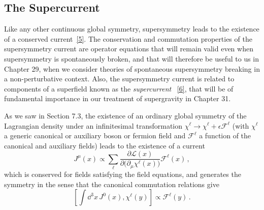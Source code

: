 
\subsection{The Supercurrent}

\providecommand{\SuperD}{\mathcal{D}}
\providecommand{\SuperQ}{\mathcal{Q}}

Like any other continuous global symmetry, supersymmetry leads to the
existence of a conserved current~\hyperref[ch26-ref-5]{[5]}. The conservation
and commutation properties of the supersymmetry current are operator
equations that will remain valid even when supersymmetry is spontaneously
broken, and that will therefore be useful to us in Chapter 29, when we
consider theories of spontaneous supersymmetry breaking in a
non-perturbative context. Also, the supersymmetry current is related to
components of a superfield known as the \emph{supercurrent}%
~\hyperref[ch26-ref-6]{[6]}, that will be of fundamental importance in our
treatment of supergravity in Chapter 31.

As we saw in Section 7.3, the existence of an ordinary global symmetry of the
Lagrangian density under an infinitesimal transformation
\(\chi^\ell\longrightarrow\chi^\ell+\epsilon\mathcal{F}^\ell\) (with
\(\chi^\ell\) a generic canonical or auxiliary boson or fermion field and
\(\mathcal{F}^\ell\) a function of the canonical and auxiliary fields) leads
to the existence of a current
\[
  J^\mu(x)\propto
  \sum_\ell
  \frac{\partial\mathcal{L}(x)}
       {\partial\bigl(\partial_\mu\chi^\ell(x)\bigr)}
  \mathcal{F}^\ell(x)\,,
\]
which is conserved for fields satisfying the field equations, and generates
the symmetry in the sense that the canonical commutation relations give
\[
  \left[
    \int \dd^3x\,J^0(x),\chi^\ell(y)
  \right]
  \propto\mathcal{F}^\ell(y)\,.
\]

